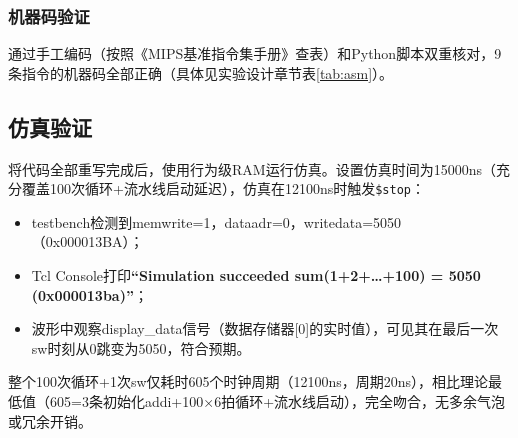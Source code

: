 \subsubsection{机器码验证}

通过手工编码（按照《MIPS基准指令集手册》查表）和Python脚本双重核对，9条指令的机器码全部正确（具体见实验设计章节表\ref{tab:asm}）。

\subsection{仿真验证}

将代码全部重写完成后，使用行为级RAM运行仿真。设置仿真时间为15000ns（充分覆盖100次循环+流水线启动延迟），仿真在12100ns时触发\texttt{\$stop}：

\begin{itemize}
    \item testbench检测到memwrite=1，dataadr=0，writedata=5050（0x000013BA）；
    \item Tcl Console打印\textbf{``Simulation succeeded sum(1+2+\ldots+100) = 5050 (0x000013ba)''}；
    \item 波形中观察display\_data信号（数据存储器[0]的实时值），可见其在最后一次sw时刻从0跳变为5050，符合预期。
\end{itemize}

整个100次循环+1次sw仅耗时605个时钟周期（12100ns，周期20ns），相比理论最低值（605=3条初始化addi+100×6拍循环+流水线启动），完全吻合，无多余气泡或冗余开销。
